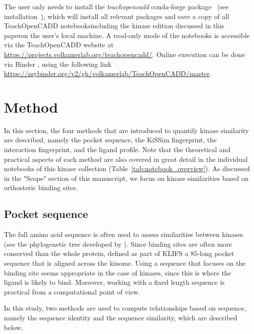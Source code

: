 \documentclass[9pt,training]{livecoms}
\begin{document}
The user only needs to install the \textit{teachopencadd} conda-forge package~\cite{toc_conda_forge_2022} (see installation~\cite{toc_website_installing}), which will install all relevant packages and save a copy of all TeachOpenCADD notebooks\textemdash including the kinase edition discussed in this paper\textemdash on the user's local machine. A read-only mode of the notebooks is accessible via the TeachOpenCADD website at \href{https://projects.volkamerlab.org/teachopencadd/}{https://projects.volkamerlab.org/teachopencadd/}. Online execution can be done via Binder \cite{binder_2018}, using the following link \url{https://mybinder.org/v2/gh/volkamerlab/TeachOpenCADD/master}.

\section{Method}
\label{sec:method}
In this section, the four methods that are introduced to quantify kinase similarity are described, namely the pocket sequence, the KiSSim fingerprint, the interaction fingerprint, and the ligand profile. Note that the theoretical and practical aspects of each method are also covered in great detail in the individual notebooks of this kinase collection (Table~\ref{tab:notebook_overview}). As discussed in the "Scope" section of this manuscript, we focus on kinase similarities based on orthosteric binding sites.

\subsection{Pocket sequence}
The full amino acid sequence is often used to assess similarities between kinases (see the phylogenetic tree developed by \citet{Manning_2022_science}). Since binding sites are often more conserved than the whole protein, \citet{van_Linden_2013_JMedChem} defined as part of KLIFS a $85$-long pocket sequence that is aligned across the kinome. Using a sequence that focuses on the binding site seems appropriate in the case of kinases, since this is where the ligand is likely to bind. Moreover, working with a fixed length sequence is practical from a computational point of view. 

In this study, two methods are used to compute relationships based on sequence, namely the sequence identity and the sequence similarity, which are described below. 
\end{document}
